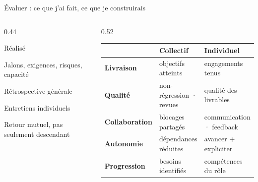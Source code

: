 \begin{frame}{Évaluer : ce que j'ai fait, ce que je construirais}
\begin{columns}[T]
\begin{column}{0.44\linewidth}
\begin{block}{Réalisé}
\small
\begin{tightitems}
  \item Jalons, exigences, risques, capacité
  \item Rétrospective générale
  \item Entretiens individuels
  \item Retour mutuel, pas seulement descendant
\end{tightitems}
\end{block}
\small{}
\end{column}
\begin{column}{0.52\linewidth}
\scriptsize
\begin{tabularx}{\linewidth}{>{\bfseries}p{1.8cm}XX}
\toprule
 & Collectif & Individuel \\
\midrule
Livraison & objectifs atteints & engagements tenus \\
Qualité & non-régression · revues & qualité des livrables \\
Collaboration & blocages partagés & communication · feedback \\
Autonomie & dépendances réduites & avancer + expliciter \\
Progression & besoins identifiés & compétences du rôle \\
\bottomrule
\end{tabularx}
\vspace{0.35em}
\small{}
\end{column}
\end{columns}
\end{frame}

